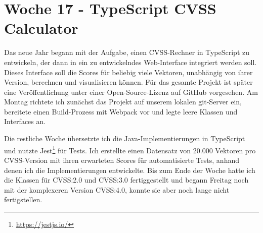 \section{Woche 17 - TypeScript CVSS Calculator} \label{sec:bericht-wo-17}


\lweekdaymarginpar{\weekdayMondayLong}

Das neue Jahr begann mit der Aufgabe, einen CVSS-Rechner in TypeScript zu entwickeln, der dann in ein zu entwickelndes Web-Interface integriert werden soll.
Dieses Interface soll die Scores für beliebig viele Vektoren, unabhängig von ihrer Version, berechnen und visualisieren können.
Für das gesamte Projekt ist später eine Veröffentlichung unter einer Open-Source-Lizenz auf GitHub vorgesehen.
Am Montag richtete ich zunächst das Projekt auf unserem lokalen git-Server ein, bereitete einen Build-Prozess mit Webpack vor und legte leere Klassen und Interfaces an.

\sweekdaymarginpar{\weekdayTuesdayShort--\weekdayFridayShort}

Die restliche Woche übersetzte ich die Java-Implementierungen in TypeScript und nutzte Jest\footnote{\url{https://jestjs.io/}} für Tests.
Ich erstellte einen Datensatz von 20.000 Vektoren pro CVSS-Version mit ihren erwarteten Scores für automatisierte Tests, anhand denen ich die Implementierungen entwickelte.
Bis zum Ende der Woche hatte ich die Klassen für CVSS:2.0 und CVSS:3.0 fertiggestellt und begann Freitag noch mit der komplexeren Version CVSS:4.0, konnte sie aber noch lange nicht fertigstellen.
